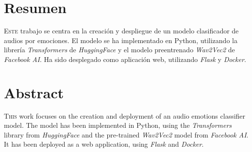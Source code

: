 \chapter*{Resumen}
\pagestyle{especial}
{}

\lettrine[lraise=-0.1, lines=2, loversize=0.2]{E}{ste} trabajo se centra en la creación y despliegue de un modelo clasificador de audios por emociones.
El modelo se ha implementado en Python, utilizando la librería  \textit{Transformers} de \textit{HuggingFace} y el modelo preentrenado \textit{Wav2Vec2} de \textit{Facebook AI}.
Ha sido desplegado como aplicación web, utilizando \textit{Flask} y \textit{Docker}.



\chapter*{Abstract}
\pagestyle{especial}
{}

\lettrine[lraise=-0.1, lines=2, loversize=0.2]{T}{his} work focuses on the creation and deployment of an audio emotions classifier model.
The model has been implemented in Python, using the \textit{Transformers} library from \textit{HuggingFace} and the pre-trained \textit{Wav2Vec2} model from \textit{Facebook AI}.
It has been deployed as a web application, using \textit{Flask} and \textit{Docker}.

\endinput
